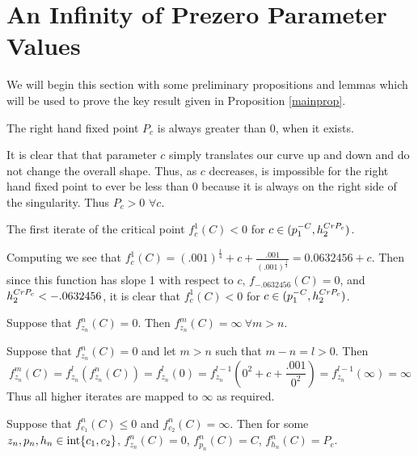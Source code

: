 \section{An Infinity of Prezero Parameter Values}
		We will begin this section with some preliminary propositions and lemmas which will be used to prove the key result given in Proposition \ref{mainprop}.
		\begin{mylemma}\label{fppos}
			The right hand fixed point $P_c$ is always greater than 0, when it exists.
		\end{mylemma}

		\begin{myproof}
			It is clear that that parameter $c$ simply translates our curve up and down and do not change the overall shape. Thus, as $c$ decreases, is impossible for the right hand fixed point to ever be less than 0 because it is always on the right side of the singularity. Thus $P_c > 0$ $\forall c$.
		\end{myproof}

		\begin{mylemma}\label{fppos}
			The first iterate of the critical point $f^1_c (C) < 0$ for $c \in (p^{-C}_1, h^{CrP_c}_2)$.
		\end{mylemma}

		\begin{myproof}
			Computing we see that $f^1_c (C) = (.001)^{\frac{1}{4}} + c + \frac{.001}{ (.001)^{\frac{1}{4}}} = 0.0632456 + c$. Then since this function has slope 1 with respect to $c$, $f_{-.0632456} (C) = 0$, and $h^{CrP_c}_2 < -.0632456$, it is clear that $f^1_c (C) < 0$ for $c \in (p^{-C}_1, h^{CrP_c}_2)$.
		\end{myproof}

		\begin{mylemma} \label{zero}
		Suppose that $f^n_{z_n} (C)= 0$. Then $f^m_{z_n} (C) = \infty \ \forall m > n$. 
		\end{mylemma}

		\begin{myproof}
		Suppose that $f^n_{z_n} (C) = 0$ and let $m > n$ such that $m - n = l > 0$. Then
		\[
		f^{m}_{z_n} (C) = f^l_{z_n} (f^n_{z_n} (C)) = f^l_{z_n} (0) = f^{l - 1}_{z_n}\left (0^2 + c + \frac{.001}{0^2}\right) = f^{l - 1}_{z_n} (\infty) = \infty
		\]
		Thus all higher iterates are mapped to $\infty$ as required.
		\end{myproof}

		\begin{mylemma} \label{zero2}
		Suppose that $f^{n}_{c_1} (C) \leq 0$ and $f^{n}_{c_2} (C) = \infty$. Then for some $z_n,p_n,h_n \in \text{int}\{c_1,c_2\}$, $f^n_{z_n} (C) = 0$, $f^n_{p_n} (C) = C$, $f^n_{h_n} (C) = P_c$.
		\end{mylemma}

